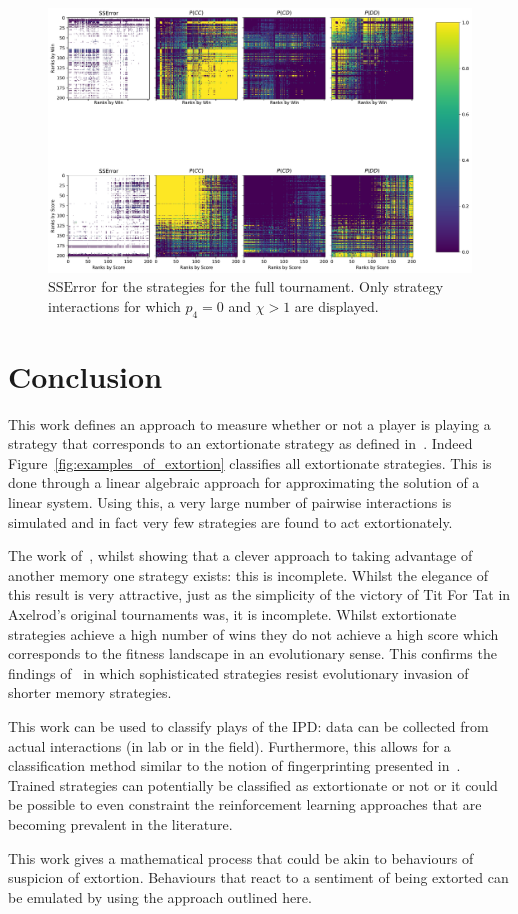 \documentclass[a4paper]{article}
\begin{document}
\begin{figure}[!htbp]
    \centering
    \includegraphics[width=.8\textwidth]{./assets/img/SSError_and_probabilities_in_full/main.pdf}
    \caption{\(\text{SSError}\) for the strategies for the full tournament. Only
    strategy interactions for which \(p_4=0\) and \(\chi>1\) are displayed.}
    \label{fig:SSError_and_probabilities_in_full}
\end{figure}


\section{Conclusion}\label{sec:conclusion}

This work defines an approach to measure whether or not a player is playing a
strategy that corresponds to an extortionate strategy as defined
in~\cite{Press2012}. Indeed Figure~\ref{fig:examples_of_extortion} classifies
all extortionate strategies. This is done through a linear algebraic approach
for approximating the solution of a linear system. Using this, a very large
number of pairwise interactions is simulated and in fact very few strategies are
found to act extortionately.

The work of~\cite{Press2012}, whilst showing that a clever approach to taking
advantage of another memory one strategy exists: this is incomplete. Whilst the
elegance of this result is very attractive, just as the simplicity of the
victory of Tit For Tat in Axelrod's original tournaments was, it is incomplete.
Whilst extortionate strategies achieve a high number of wins they do not
achieve a high score which corresponds to the fitness landscape in an
evolutionary sense.
This confirms
the findings of~\cite{Moran1707} in which sophisticated strategies resist
evolutionary invasion of shorter memory strategies.

This work can be used to classify plays of the IPD\@: data can be collected from
actual interactions (in lab or in the field). Furthermore, this allows for a
classification method similar to the notion of fingerprinting presented
in~\cite{Ashlock2008}. Trained strategies can potentially be classified as
extortionate or not or it could be possible to even constraint the reinforcement
learning approaches that are becoming prevalent in the literature.

This work gives a mathematical process that could be akin to behaviours of
suspicion of extortion. Behaviours that react to a sentiment of being extorted
can be emulated by using the approach outlined here.

\printbibliography
\end{document}
